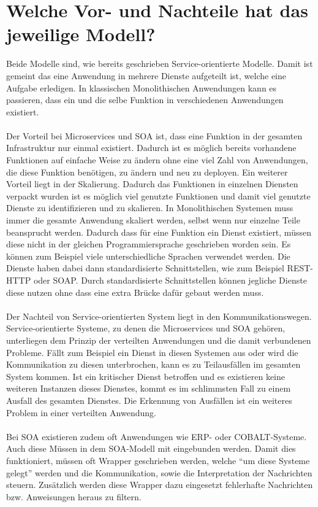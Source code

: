 \section{Welche Vor- und Nachteile hat das jeweilige Modell?}
\label{sec:VorNachteile}
Beide Modelle sind, wie bereits geschrieben Service-orientierte Modelle. Damit ist gemeint das eine Anwendung in mehrere Dienste aufgeteilt ist, welche eine Aufgabe erledigen. In klassischen Monolithischen Anwendungen kann es passieren, dass ein und die selbe Funktion in verschiedenen Anwendungen existiert.
\\\\
Der Vorteil bei Microservices und SOA ist, dass eine Funktion in der gesamten Infrastruktur nur einmal existiert. Dadurch ist es möglich bereits vorhandene Funktionen auf einfache Weise zu ändern ohne eine viel Zahl von Anwendungen, die diese Funktion benötigen, zu ändern und neu zu deployen.
Ein weiterer Vorteil liegt in der Skalierung. Dadurch das Funktionen in einzelnen Diensten verpackt wurden ist es möglich viel genutzte Funktionen und damit viel genutzte Dienste zu identifizieren und zu skalieren. In Monolithischen Systemen muss immer die gesamte Anwendung skaliert werden, selbst wenn nur einzelne Teile beansprucht werden.
Dadurch dass für eine Funktion ein Dienst existiert, müssen diese nicht in der gleichen Programmiersprache geschrieben worden sein. Es können zum Beispiel viele unterschiedliche Sprachen verwendet werden. Die Dienste haben dabei dann standardisierte Schnittstellen, wie zum Beispiel REST-HTTP oder SOAP. Durch standardisierte Schnittstellen können jegliche Dienste diese nutzen ohne dass eine extra Brücke dafür gebaut werden muss.
\\\\
Der Nachteil von Service-orientierten System liegt in den Kommunikationswegen. Service-orientierte Systeme, zu denen die Microservices und SOA gehören, unterliegen dem Prinzip der verteilten Anwendungen und die damit verbundenen Probleme. Fällt zum Beispiel ein Dienst in diesen Systemen aus oder wird die Kommunikation zu diesen unterbrochen, kann es zu Teilausfällen im gesamten System kommen. Ist ein kritischer Dienst betroffen und es existieren keine weiteren Instanzen dieses Dienstes, kommt es im schlimmsten Fall zu einem Ausfall des gesamten Dienstes. Die Erkennung von Ausfällen ist ein weiteres Problem in einer verteilten Anwendung.
\\\\
Bei SOA existieren zudem oft Anwendungen wie ERP- oder COBALT-Systeme. Auch diese Müssen in dem SOA-Modell mit eingebunden werden. Damit dies funktioniert, müssen oft Wrapper geschrieben werden, welche "`um diese Systeme gelegt"' werden und die Kommunikation, sowie die Interpretation der Nachrichten steuern. Zusätzlich werden diese Wrapper dazu eingesetzt fehlerhafte Nachrichten bzw. Anweisungen heraus zu filtern.

